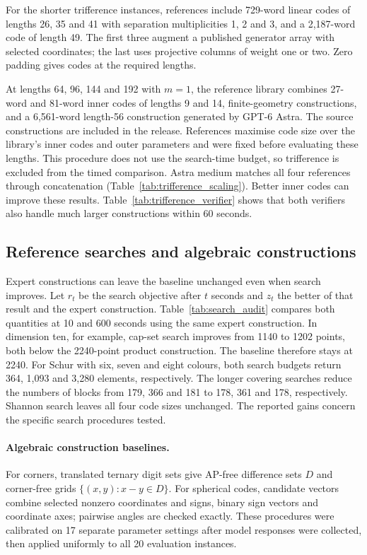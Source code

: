 For the shorter trifference instances, references include 729-word linear codes of lengths 26, 35 and 41 with separation multiplicities 1, 2 and 3, and a 2,187-word code of length 49. The first three augment a published generator array with selected coordinates; the last uses projective columns of weight one or two. Zero padding gives codes at the required lengths.

At lengths 64, 96, 144 and 192 with $m=1$, the reference library combines 27-word and 81-word inner codes of lengths 9 and 14, finite-geometry constructions, and a 6,561-word length-56 construction generated by GPT-6 Astra. The source constructions are included in the release. References maximise code size over the library's inner codes and outer parameters and were fixed before evaluating these lengths. This procedure does not use the search-time budget, so trifference is excluded from the timed comparison. Astra medium matches all four references through concatenation (Table~\ref{tab:trifference_scaling}). Better inner codes can improve these results. Table~\ref{tab:trifference_verifier} shows that both verifiers also handle much larger constructions within 60 seconds.

\appendixpage
\subsection{Reference searches and algebraic constructions}
\label{app:search_audit}
Expert constructions can leave the baseline unchanged even when search improves. Let $r_t$ be the search objective after $t$ seconds and $z_t$ the better of that result and the expert construction. Table~\ref{tab:search_audit} compares both quantities at 10 and 600 seconds using the same expert construction. In dimension ten, for example, cap-set search improves from 1140 to 1202 points, both below the 2240-point product construction. The baseline therefore stays at 2240. For Schur with six, seven and eight colours, both search budgets return 364, 1,093 and 3,280 elements, respectively. The longer covering searches reduce the numbers of blocks from 179, 366 and 181 to 178, 361 and 178, respectively. Shannon search leaves all four code sizes unchanged. The reported gains concern the specific search procedures tested.

\paragraph{Algebraic construction baselines.}
For corners, translated ternary digit sets give AP-free difference sets $D$ and corner-free grids $\{(x,y):x-y\in D\}$. For spherical codes, candidate vectors combine selected nonzero coordinates and signs, binary sign vectors and coordinate axes; pairwise angles are checked exactly. These procedures were calibrated on 17 separate parameter settings after model responses were collected, then applied uniformly to all 20 evaluation instances.

